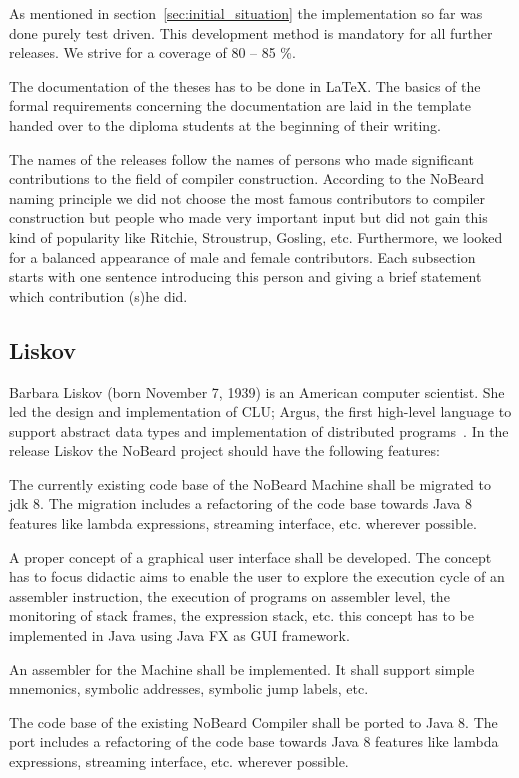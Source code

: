 \documentclass[11pt]{article}
\begin{document}
As  mentioned in section~\ref{sec:initial_situation} the implementation so far was done purely test driven. This development method is mandatory for all further releases. We strive for a coverage of 80 -- 85 \%.

The documentation of the theses has to be done in \LaTeX. The basics of the formal requirements concerning the documentation are laid in the template handed over to the diploma students at the beginning of their writing.

The names of the releases follow the names of persons who made significant contributions to the field of compiler construction. According to the NoBeard naming principle we did not choose the most famous contributors to compiler construction but people who made very important input but did not gain this kind of popularity like Ritchie, Stroustrup, Gosling, etc. Furthermore, we looked for a balanced appearance of male and female contributors. Each subsection starts with one sentence introducing this person and giving a brief statement which contribution (s)he did.

\subsection{Liskov}
Barbara Liskov (born November 7, 1939) is an American computer scientist. She led the design and implementation of CLU; Argus, the first high-level language to support abstract data types and implementation of distributed programs~\cite{wikipedia_barbara_2015}. In the release Liskov the NoBeard project should have the following features:

The currently existing code base of the NoBeard Machine shall  be migrated to jdk 8. The migration includes a refactoring of the code base towards Java 8 features like lambda expressions, streaming interface, etc. wherever possible.

A proper concept of a graphical user interface shall be developed. The concept has to focus didactic aims to enable the user to explore the execution cycle of an assembler instruction, the execution of programs on assembler level, the monitoring of stack frames, the expression stack, etc. this concept has to be implemented in Java using Java FX as GUI framework. 

An assembler for the Machine shall be implemented. It shall support simple mnemonics, symbolic addresses, symbolic jump labels, etc.

The code base of the existing NoBeard Compiler shall be ported to Java 8. The port includes a refactoring of the code base towards Java 8 features like lambda expressions, streaming interface, etc. wherever possible.
\end{document}
